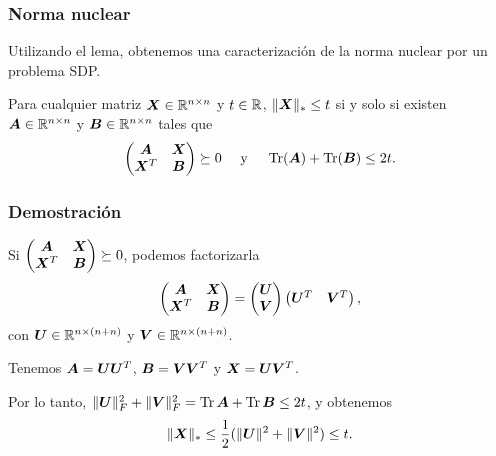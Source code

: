 \documentclass[aspectratio=169,12pt,spanish]{beamer}
\begin{document}

\begin{frame}
\frametitle{Norma nuclear}

Utilizando el lema, obtenemos una caracterización de la norma nuclear por un problema SDP.

\begin{lemma}
Para cualquier matriz $\bm{X} \in \mathbb{R}^{n \times n}$ y $t \in \mathbb{R}$, $\|\bm{X}\|_* \le t$ si y solo si existen $\bm{A} \in \mathbb{R}^{n \times n}$ y $\bm{B} \in \mathbb{R}^{n \times n}$ tales que
$$
\begin{pmatrix} \bm{A} & \bm{X} \\ \bm{X}^T & \bm{B} \end{pmatrix} \succeq 0 \quad \text{ y } \quad \operatorname{Tr}(\bm{A}) + \operatorname{Tr}(\bm{B}) \le 2t.
$$
\end{lemma}



\end{frame}


\begin{frame}
\frametitle{Demostración}

Si $\begin{pmatrix} \bm{A} & \bm{X} \\ \bm{X}^T & \bm{B} \end{pmatrix} \succeq 0$, podemos factorizarla
$$
\begin{pmatrix} \bm{A} & \bm{X} \\ \bm{X}^T & \bm{B} \end{pmatrix} = \begin{pmatrix} \bm{U} \\ \bm{V} \end{pmatrix}
\begin{pmatrix} \bm{U}^T & \bm{V}^T \end{pmatrix},
$$
con $\bm{U} \in \mathbb{R}^{n \times (n+n)}$ y $\bm{V} \in \mathbb{R}^{n \times (n+n)}$.

Tenemos $\bm{A} = \bm{U} \bm{U}^T$,  $\bm{B} = \bm{V} \bm{V}^T$ y $\bm{X} = \bm{U} \bm{V}^T$.

Por lo tanto, $\|\bm{U}\|_F^2 + \|\bm{V}\|_F^2 = \operatorname{Tr} \bm{A} + \operatorname{Tr} \bm{B} \le 2t$, y obtenemos
$$\|\bm{X}\|_* \le \frac{1}{2}(\|\bm{U}\|^2 + \|\bm{V}\|^2) \le t.$$


\end{frame}

\end{document}

